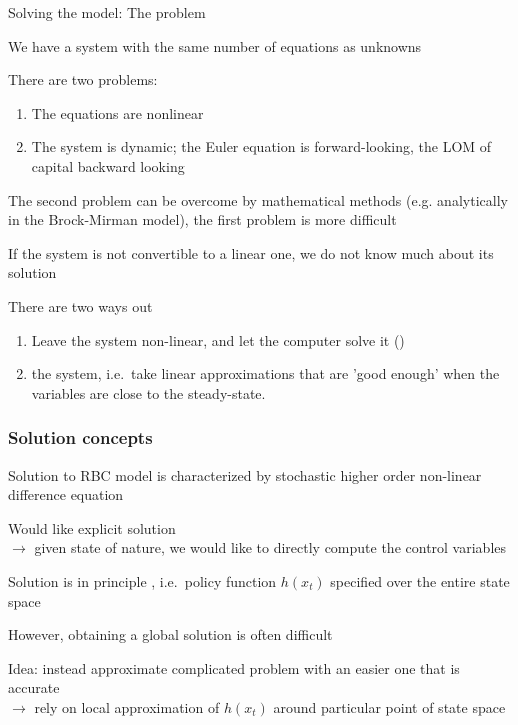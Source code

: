 \documentclass[handout,usepdftitle=false,xcolor=dvipsnames,aspectratio=169]{beamer}
\begin{document}
\begin{frame}{Solving the model: The problem}\label{RBCProblemSlide}
\begin{witemize}
\item We have a system with the same number of equations as unknowns
\item There are two problems:
\begin{enumerate}
    \item The equations are nonlinear
    \item The system is dynamic; the Euler equation is forward-looking, the LOM of capital backward looking
\end{enumerate}
\item The second problem can be overcome by mathematical methods (e.g. analytically in the Brock-Mirman model), the first problem is more difficult
\item If the system is not convertible to a linear one, we do not know much about its solution
\item There are two ways out
\begin{enumerate}
\item Leave the system non-linear, and let the computer solve it ()
\item {} the system, i.e.\ take linear approximations that are 'good enough' when the variables are close to the steady-state.
\end{enumerate}
\end{witemize}
\end{frame}

\begin{frame}
\frametitle{Solution concepts}
\begin{witemize}
    \item Solution to RBC model is characterized by stochastic higher order non-linear difference equation

    \item Would like explicit solution\\
     $\rightarrow$ given state of nature, we would like to directly compute the control variables
 \item Solution is in principle , i.e.\ policy function $h(x_t)$ specified over the entire state space
\item However, obtaining a global solution is often difficult
\item Idea: instead approximate complicated problem with an easier one that is  accurate\\
    $\rightarrow$ rely on local approximation of $h(x_t)$ around particular point of state space
\end{witemize}
\end{frame}
\end{document}
